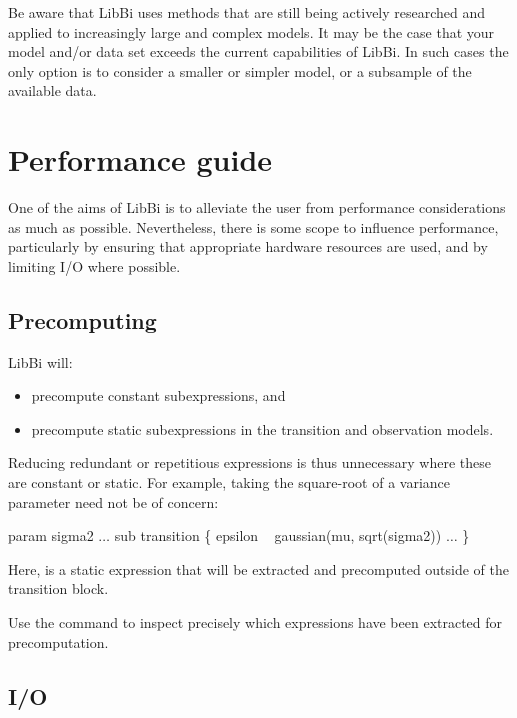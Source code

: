 Be aware that LibBi uses methods that are still being actively researched and
applied to increasingly large and complex models. It may be the case that your
model and/or data set exceeds the current capabilities of LibBi. In such cases
the only option is to consider a smaller or simpler model, or a subsample of
the available data.

\section{Performance guide\label{Performance guide}}

One of the aims of LibBi is to alleviate the user from performance
considerations as much as possible. Nevertheless, there is some scope to
influence performance, particularly by ensuring that appropriate hardware
resources are used, and by limiting I/O where possible.

\subsection{Precomputing}

LibBi will:
\begin{itemize}
\item precompute constant subexpressions, and
\item precompute static subexpressions in the transition and observation
  models.
\end{itemize}
Reducing redundant or repetitious expressions is thus unnecessary where these
are constant or
static. For example, taking the square-root of a
variance parameter need not be of concern:
\begin{bicode}
param sigma2
\(\ldots\)
sub transition \{
  epsilon ~ gaussian(mu, sqrt(sigma2))
  \(\ldots\)
\}
\end{bicode}
Here,  is a static expression
that will be extracted and precomputed outside of the transition block.

\begin{tip}
Use the  command to inspect precisely which expressions
have been extracted for precomputation.
\end{tip}

\subsection{I/O}


